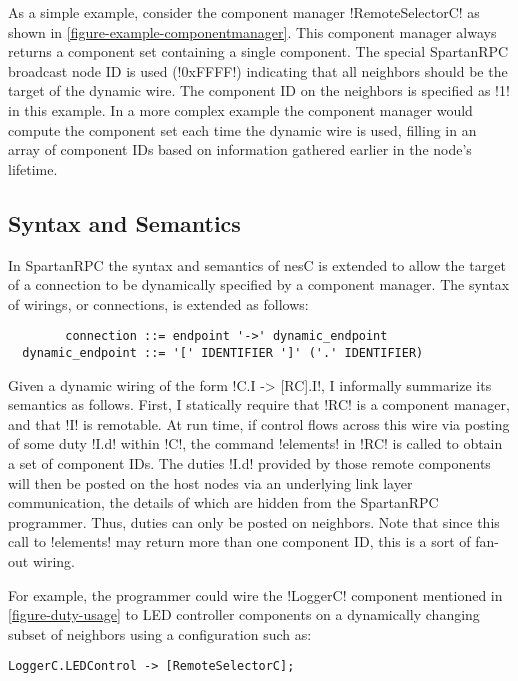 As a simple example, consider the component manager !RemoteSelectorC! as shown in
\autoref{figure-example-componentmanager}. This component manager always returns a component set
containing a single component. The special SpartanRPC broadcast node ID is used (!0xFFFF!)
indicating that all neighbors should be the target of the dynamic wire. The component ID on the
neighbors is specified as !1! in this example. In a more complex example the component manager
would compute the component set each time the dynamic wire is used, filling in an array of
component IDs based on information gathered earlier in the node's lifetime.


\subsection{Syntax and Semantics}
\label{section-wiringsyntax}

In SpartanRPC the syntax and semantics of nesC is extended to allow the target of a connection
to be dynamically specified by a component manager. The syntax of wirings, or connections, is
extended as follows:

\singlespace
\begin{Verbatim}
        connection ::= endpoint '->' dynamic_endpoint
  dynamic_endpoint ::= '[' IDENTIFIER ']' ('.' IDENTIFIER)
\end{Verbatim}
\primaryspacing

Given a dynamic wiring of the form !C.I -> [RC].I!, I informally summarize its semantics as
follows. First, I statically require that !RC! is a component manager, and that !I! is
remotable. At run time, if control flows across this wire via posting of some duty !I.d! within
!C!, the command !elements! in !RC! is called to obtain a set of component IDs. The duties !I.d!
provided by those remote components will then be posted on the host nodes via an underlying link
layer communication, the details of which are hidden from the SpartanRPC programmer. Thus,
duties can only be posted on neighbors. Note that since this call to !elements! may return more
than one component ID, this is a sort of fan-out wiring.

For example, the programmer could wire the !LoggerC! component mentioned in
\autoref{figure-duty-usage} to LED controller components on a dynamically changing subset of
neighbors using a configuration such as:
\begin{lstlisting}
LoggerC.LEDControl -> [RemoteSelectorC];
\end{lstlisting}

